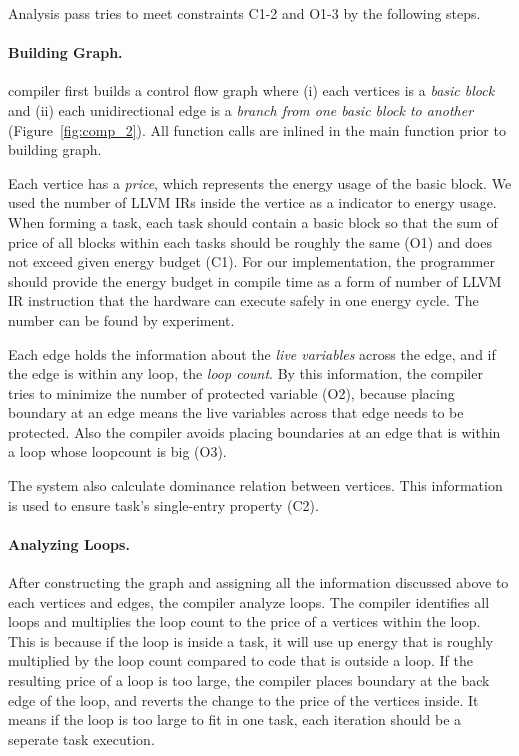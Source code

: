 Analysis pass tries to meet constraints C1-2 and O1-3 by the following steps.

\paragraph{Building Graph.} 

\sys compiler first builds a control flow graph where (i) each vertices is a \emph{basic block} and (ii) each unidirectional edge is a \emph{branch from one basic block to another} (Figure~\ref{fig:comp_2}). All function calls are inlined in the main function prior to building graph.

Each vertice has a {\em price}, which represents the energy usage of the basic block. We used the number of LLVM IRs inside the vertice as a indicator to energy usage. When forming a task, each task should contain a basic block so that the sum of price of all blocks within each tasks should be roughly the same (O1) and does not exceed given energy budget (C1). For our implementation, the programmer should provide the energy budget in compile time as a form of number of LLVM IR instruction that the hardware can execute safely in one energy cycle. The number can be found by experiment.

Each edge holds the information about the {\em live variables} across the edge, and if the edge is within any loop, the {\em loop count}. By this information, the compiler tries to minimize the number of protected variable (O2), because placing boundary at an edge means the live variables across that edge needs to be protected. Also the compiler avoids placing boundaries at an edge that is within a loop whose loopcount is big (O3).

The system also calculate dominance relation between vertices. This information is used to ensure task's single-entry
property (C2).

\paragraph{Analyzing Loops.} 

After constructing the graph and assigning all the information discussed above to each vertices and edges, 
the compiler analyze loops. The compiler identifies all loops and multiplies the loop count to the price of a vertices
within the loop. This is because if the loop is inside a task, it will use up energy that is roughly multiplied by the 
loop count compared to code that is outside a loop. If the resulting price of a loop is too large, the compiler
places boundary at the back edge of the loop, and reverts the change to the price of the vertices inside. It means
if the loop is too large to fit in one task, each iteration should be a seperate task execution.

